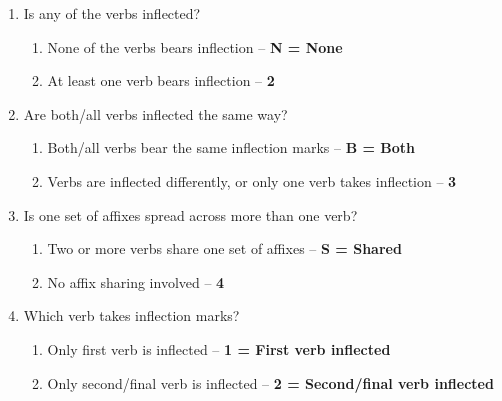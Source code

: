 \begin{enumerate}
\item Is any of the verbs inflected?
\begin{enumerate}
\item None of the verbs bears inflection -- \textbf{N = None}
\item At least one verb bears inflection -- \textbf{2}
\end{enumerate}
\item Are both/all verbs inflected the same way?
\begin{enumerate}
\item Both/all verbs bear the same inflection marks -- \textbf{B = Both}
\item Verbs are inflected differently, or only one verb takes inflection -- \textbf{3}
\end{enumerate}
\item Is one set of affixes spread across more than one verb?
\begin{enumerate}
\item Two or more verbs share one set of affixes -- \textbf{S = Shared}
\item No affix sharing involved -- \textbf{4}
\end{enumerate}
\item Which verb takes inflection marks?
\begin{enumerate}
\item Only first verb is inflected -- \textbf{1 = First verb inflected}
\item Only second/final verb is inflected -- \textbf{2 = Second/final verb inflected}
\end{enumerate}
\end{enumerate}


